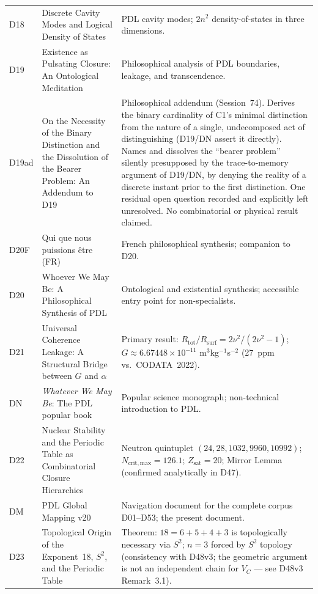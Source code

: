 \documentclass[11pt,a4paper]{article}
\theoremstyle{plain}
\theoremstyle{definition}
\theoremstyle{remark}
\begin{document}
\begin{longtable}{L{1.3cm}L{3.8cm}L{8.0cm}}
D18 & Discrete Cavity Modes and Logical Density of States~\cite{D18} & PDL cavity modes; $2n^2$ density-of-states in three dimensions.\\[0.3em]
D19 & Existence as Pulsating Closure: An Ontological Meditation~\cite{D19} & Philosophical analysis of PDL boundaries, leakage, and transcendence.\\[0.3em]
D19ad & On the Necessity of the Binary Distinction and the Dissolution of the Bearer Problem: An Addendum to D19~\cite{D19ad} & Philosophical addendum (Session~74). Derives the binary cardinality of C1's minimal distinction from the nature of a single, undecomposed act of distinguishing (D19/DN assert it directly). Names and dissolves the ``bearer problem'' silently presupposed by the trace-to-memory argument of D19/DN, by denying the reality of a discrete instant prior to the first distinction. One residual open question recorded and explicitly left unresolved. No combinatorial or physical result claimed.\\[0.3em]
D20F & Qui que nous puissions \^etre (FR)~\cite{D20F} & French philosophical synthesis; companion to D20.\\[0.3em]
D20 & Whoever We May Be: A Philosophical Synthesis of PDL~\cite{D20} & Ontological and existential synthesis; accessible entry point for non-specialists.\\[0.3em]
D21 & Universal Coherence Leakage: A Structural Bridge between $G$ and $\alpha$~\cite{D21} & \textcolor{proofblue}{Primary result}: $R_{\mathrm{tot}}/R_{\mathrm{surf}} = 2\nu^2/(2\nu^2-1)$; $G \approx 6.67448\times 10^{-11}$ m$^3$kg$^{-1}$s$^{-2}$ (27~ppm vs.\ CODATA~2022).\\[0.3em]
DN & \emph{Whatever We May Be}: The PDL popular book~\cite{DN} & Popular science monograph; non-technical introduction to PDL.\\[0.3em]
D22 & Nuclear Stability and the Periodic Table as Combinatorial Closure Hierarchies~\cite{D22} & Neutron quintuplet $(24,28,1032,9960,10992)$; $N_{\mathrm{crit,max}}=126.1$; $Z_{\mathrm{sat}}=20$; Mirror Lemma (confirmed analytically in D47).\\[0.3em]
DM & PDL Global Mapping v20~\cite{DMapv10} & Navigation document for the complete corpus D01--D53; the present document.\\[0.3em]
D23 & Topological Origin of the Exponent~18, $S^2$, and the Periodic Table~\cite{D23} & \textcolor{proofblue}{Theorem}: $18=6+5+4+3$ is topologically necessary via $S^2$; $n=3$ forced by $S^2$ topology (consistency with D48v3; the geometric argument is not an independent chain for $V_C$ --- see D48v3 Remark~3.1).\\[0.3em]

\end{longtable}
\end{document}
